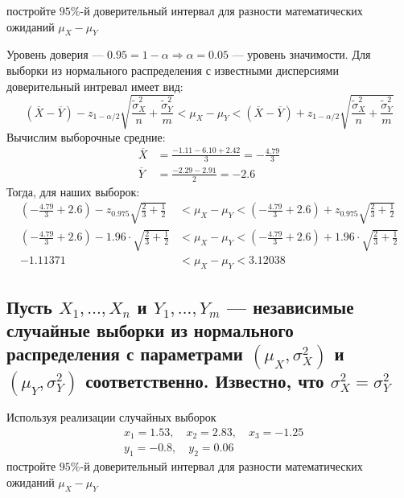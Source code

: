 \documentclass{article}
\begin{document}
постройте $95 \%$-й доверительный интервал для разности математических ожиданий $\mu_{X}-\mu_{Y}$

Уровень доверия — $0.95=1-\alpha\Longrightarrow\alpha=0.05$ — уровень значимости. Для выборки из нормального распределения с известными дисперсиями доверительный интревал имеет вид:
\begin{equation*}
    (\overline{X}-\overline{Y})-z_{1-\alpha / 2} \sqrt{\frac{\tilde{\sigma}_X^2}{n}+\frac{\tilde{\sigma}_Y^2}{m}} < \mu_X-\mu_Y <(\overline{X}-\overline{Y})+z_{1-\alpha / 2} \sqrt{\frac{\tilde{\sigma}_X^2}{n}+\frac{\tilde{\sigma}_Y^2}{m}}
\end{equation*}
Вычислим выборочные средние:
\begin{equation*}
    \begin{aligned}
        \overline{X}&=\frac{-1.11-6.10+2.42}{3}=-\frac{4.79}{3}\\
        \overline{Y}&=\frac{-2.29-2.91}{2}=-2.6
    \end{aligned}
\end{equation*}
Тогда, для наших выборок:
\begin{equation*}
    \begin{aligned}
        \left(-\frac{4.79}{3}+2.6\right)-z_{0.975}\sqrt{\frac{2}{3}+\frac{1}{2}}&<\mu_X-\mu_Y<\left(-\frac{4.79}{3}+2.6\right)+z_{0.975}\sqrt{\frac{2}{3}+\frac{1}{2}}\\
        \left(-\frac{4.79}{3}+2.6\right)-1.96\cdot\sqrt{\frac{2}{3}+\frac{1}{2}}&<\mu_X-\mu_Y<\left(-\frac{4.79}{3}+2.6\right)+1.96\cdot\sqrt{\frac{2}{3}+\frac{1}{2}}\\
        -1.11371&<\mu_X-\mu_Y<3.12038
    \end{aligned}
\end{equation*}

\subsection{Пусть $X_{1}, \ldots, X_{n}$ и $Y_{1}, \ldots, Y_{m}$ — независимые случайные выборки из нормального распределения с параметрами $\left(\mu_{X}, \sigma_{X}^{2}\right)$ и $\left(\mu_{Y}, \sigma_{Y}^{2}\right)$ соответственно. Известно, что $\sigma_{X}^{2}=\sigma_{Y}^{2}$}
Используя реализации случайных выборок
\begin{equation*}
    \begin{aligned}
        & x_{1}=1.53, \quad x_{2}=2.83, \quad x_{3}=-1.25 \\
        & y_{1}=-0.8, \quad y_{2}=0.06
    \end{aligned}
\end{equation*}
постройте $95 \%$-й доверительный интервал для разности математических ожиданий $\mu_{X}-\mu_{Y}$
\end{document}
